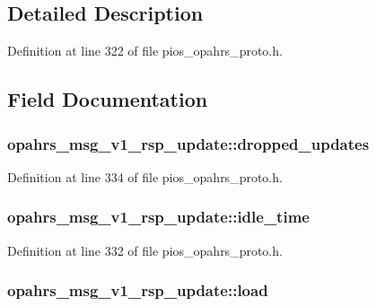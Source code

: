 \subsection{Detailed Description}


Definition at line 322 of file pios\-\_\-opahrs\-\_\-proto.\-h.



\subsection{Field Documentation}
\hypertarget{structopahrs__msg__v1__rsp__update_abb103a964b5e2270046458e06a6544f6}{
\subsubsection[{dropped\-\_\-updates}]{ opahrs\-\_\-msg\-\_\-v1\-\_\-rsp\-\_\-update\-::dropped\-\_\-updates}}\label{structopahrs__msg__v1__rsp__update_abb103a964b5e2270046458e06a6544f6}


Definition at line 334 of file pios\-\_\-opahrs\-\_\-proto.\-h.

\hypertarget{structopahrs__msg__v1__rsp__update_aab507b5aac4289faaba5550387d95b98}{
\subsubsection[{idle\-\_\-time}]{ opahrs\-\_\-msg\-\_\-v1\-\_\-rsp\-\_\-update\-::idle\-\_\-time}}\label{structopahrs__msg__v1__rsp__update_aab507b5aac4289faaba5550387d95b98}


Definition at line 332 of file pios\-\_\-opahrs\-\_\-proto.\-h.

\hypertarget{structopahrs__msg__v1__rsp__update_a9f2f38faae047fc07186b34b9b84e4ef}{
\subsubsection[{load}]{ opahrs\-\_\-msg\-\_\-v1\-\_\-rsp\-\_\-update\-::load}}\label{structopahrs__msg__v1__rsp__update_a9f2f38faae047fc07186b34b9b84e4ef}


